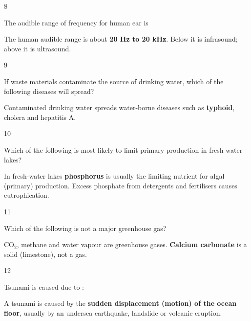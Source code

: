 \begin{question}{8}
{The audible range of frequency for human ear is\par}
\begin{explain}
The human audible range is about \textbf{20 Hz to 20 kHz}. Below it is infrasound; above it is ultrasound.
\end{explain}
\end{question}

\begin{question}{9}
{If waste materials contaminate the source of drinking water, which of the following diseases will spread?\par}
\begin{explain}
Contaminated drinking water spreads water-borne diseases such as \textbf{typhoid}, cholera and hepatitis A.
\end{explain}
\end{question}

\begin{question}{10}
{Which of the following is most likely to limit primary production in fresh water lakes?\par}
\begin{explain}
In fresh-water lakes \textbf{phosphorus} is usually the limiting nutrient for algal (primary) production. Excess phosphate from detergents and fertilisers causes eutrophication.
\end{explain}
\end{question}

\begin{question}{11}
{Which of the following is not a major greenhouse gas?\par}
\begin{explain}
CO$_2$, methane and water vapour are greenhouse gases. \textbf{Calcium carbonate} is a solid (limestone), not a gas.
\end{explain}
\end{question}

\begin{question}{12}
{Tsunami is caused due to :\par}
\begin{explain}
A tsunami is caused by the \textbf{sudden displacement (motion) of the ocean floor}, usually by an undersea earthquake, landslide or volcanic eruption.
\end{explain}
\end{question}

